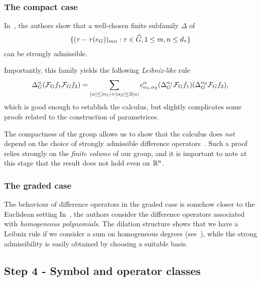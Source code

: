 \subsubsection*{The compact case}

In~\cite{RuzhanskyTurunenWirth10},
the authors show that a well-chosen finite subfamily $\Delta$ of
\begin{align*}
    \{(\tau - \tau(e_G))_{m n} : \tau \in {\widehat{G}}, 1 \leq m, n \leq {d_{\tau}}\}
\end{align*}
can be strongly admissible.

Importantly,
this family yields the following \emph{Leibniz-like} rule
\begin{align*}
    {\Delta_{G}^{\alpha}} (\mathcal{F}_{G} f_1 \mathcal{F}_{G} f_2)
    = \sum_{\left|{\alpha}\right| \leq \left|{\alpha_1}\right| + \left|{\alpha_2}\right| \leq 2 \left|{\alpha}\right|}
    c^\alpha_{\alpha_1, \alpha_2}
    ({\Delta_{G}^{\alpha_1}} \mathcal{F}_{G} f_1)
    ({\Delta_{G}^{\alpha_2}} \mathcal{F}_{G} f_2),
\end{align*}
which is good enough to establish the calculus,
but slightly complicates some proofs related to the construction of parametrices.

The compactness of the group allows us to show that the calculus does \emph{not} depend on the choice of strongly admissible difference operators~\cite{RuzhanskyTurunenWirth10,Fischer2015}.
Such a proof relies strongly on the \emph{finite volume} of our group,
and it is important to note at this stage that the result does not hold even on $\mathbb{R}^n$.

\subsubsection*{The graded case}

The behaviour of difference operators in the graded case is somehow closer to the Euclidean setting
In~\cite{FischerRuzhansky16},
the authors consider the difference operators associated with \emph{homogeneous polynomials}.
The dilation structure
shows that we have a Leibniz rule if we consider a sum on homogeneous degrees
(see~\cite[Subsection 5.2.1]{FischerRuzhansky16}),
while the strong admissibility is easily obtained by choosing a suitable basis.

\subsection*{Step 4 - Symbol and operator classes}

